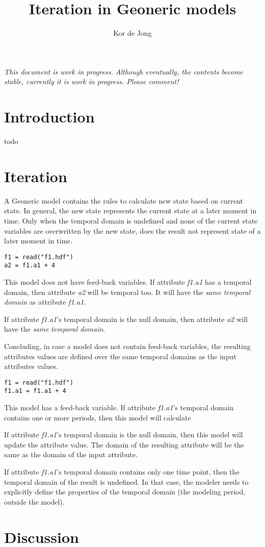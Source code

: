 \documentclass[10pt, a4paper]{article}
\begin{document}
\title{Iteration in Geoneric models}
\author{Kor de Jong}
\maketitle

\emph{This document is work in progress. Although eventually, the contents become stable, currently it is work in progress. Please comment!}

\section{Introduction}
todo

\section{Iteration}
A Geoneric model contains the rules to calculate new state based on current state. In general, the new state represents the current state at a later moment in time. Only when the temporal domain is undefined and none of the current state variables are overwritten by the new state, does the result not represent state of a later moment in time.

\begin{lstlisting}
f1 = read("f1.hdf")
a2 = f1.a1 + 4
\end{lstlisting}

This model does not have feed-back variables.
If attribute \emph{f1.a1} has a temporal domain, then attribute \emph{a2} will be temporal too. It will have the \emph{same temporal domain} as attribute \emph{f1.a1}.

If attribute \emph{f1.a1}'s temporal domain is the null domain, then attribute \emph{a2} will have the \emph{same temporal domain}.

Concluding, in case a model does not contain feed-back variables, the resulting attributes values are defined over the same temporal domains as the input attributes values.

\begin{lstlisting}
f1 = read("f1.hdf")
f1.a1 = f1.a1 + 4
\end{lstlisting}

This model has a feed-back variable.
If attribute \emph{f1.a1}'s temporal domain contains one or more periods, then this model will calculate 

If attribute \emph{f1.a1}'s temporal domain is the null domain, then this model will update the attribute value. The domain of the resulting attribute will be the same as the domain of the input attribute.

If attribute \emph{f1.a1}'s temporal domain contains only one time point, then the temporal domain of the result is undefined. In that case, the modeler needs to explicitly define the properties of the temporal domain (the modeling period, outside the model).

\section{Discussion}
\end{document}
